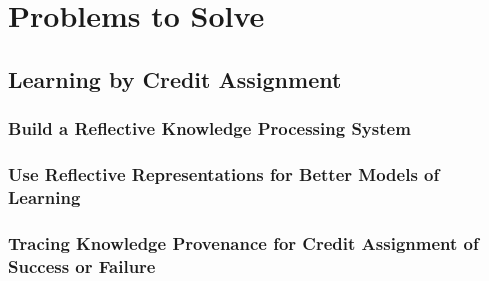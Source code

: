 \chapter{Problems to Solve}\label{ch:problems_to_solve}

\section{Learning by Credit Assignment}

\subsection{Build a Reflective Knowledge Processing System}

\subsection{Use Reflective Representations for Better Models of Learning}

\subsection{Tracing Knowledge Provenance for Credit Assignment of Success or Failure}

